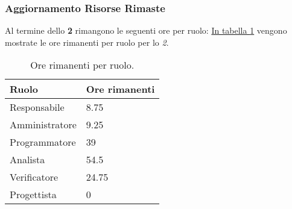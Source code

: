 \subsubsection{Aggiornamento Risorse Rimaste}
\label{sec:AggiornamentoRisorse_Sprint2}
Al termine dello \textbf{ 2} rimangono le seguenti ore per ruolo: \hyperref[tab:sprint2_ore_rimanenti]{In tabella \ref{tab:sprint2_ore_rimanenti}} vengono mostrate le ore rimanenti per ruolo per lo \textit{ 2}.

\begin{table}[H]
    \centering
    \begin{tabular}{| l | l |}
    \hline
    \textbf{Ruolo} & 
    \textbf{Ore rimanenti}\\
    \hline
        Responsabile & 8.75\\
    \hline
        Amministratore & 9.25\\
    \hline
        Programmatore & 39\\
    \hline
        Analista & 54.5\\
    \hline
        Verificatore & 24.75 \\
    \hline
        Progettista & 0\\
    \hline
    \end{tabular}
    \caption{Ore rimanenti per ruolo.}
    \label{tab:sprint2_ore_rimanenti} 
\end{table}
